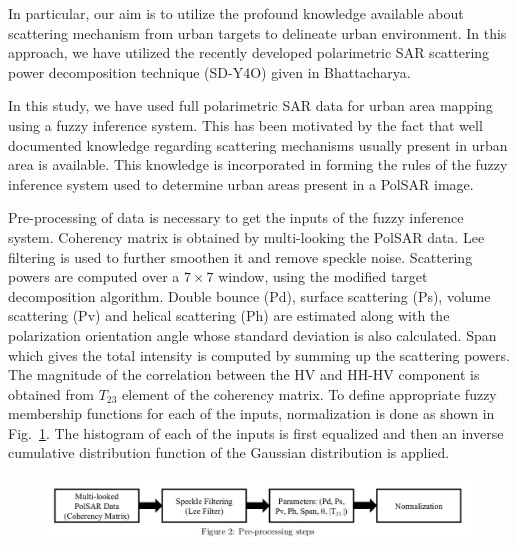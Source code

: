 \documentclass[paper=a4, fontsize=11pt]{scrartcl}
\begin{document}
In particular, our aim is to utilize the profound knowledge available about scattering mechanism from urban targets to delineate urban environment. 
In this approach, we have utilized the recently developed polarimetric SAR scattering power decomposition technique (SD-Y4O) given in Bhattacharya.

In this study, we have used full polarimetric SAR data for urban area mapping using a fuzzy inference system.
This has been motivated by the fact that well documented knowledge regarding scattering mechanisms usually present in urban area is available. 
This knowledge is incorporated in forming the rules of the fuzzy inference system used to determine urban areas present in a PolSAR image.

Pre-processing of data is necessary to get the inputs of the fuzzy inference system. 
Coherency matrix is obtained by multi-looking the PolSAR data. 
Lee filtering is used to further smoothen it and remove speckle noise.
Scattering powers are computed over a $7 \times 7$ window, using the modified target decomposition algorithm. 
Double bounce (Pd), surface scattering (Ps), volume scattering (Pv) and helical scattering (Ph) are estimated along with the polarization orientation angle whose standard deviation is also calculated. 
Span which gives the total intensity is computed by summing up the scattering powers. 
The magnitude of the correlation between the HV and HH-HV component is obtained from $T_{23}$ element of the coherency matrix.
To define appropriate fuzzy membership functions for each of the inputs, normalization is done as shown in Fig.~\ref{Fig:pre-processing}. 
The histogram of each of the inputs is first equalized and then an inverse cumulative distribution function of the Gaussian distribution is applied. 

\begin{figure}[hbt]
	\centering
	\includegraphics[width=0.7\linewidth]{Figures/Pre-processing.jpg}
	\label{Fig:pre-processing}
\end{figure}
\end{document}

